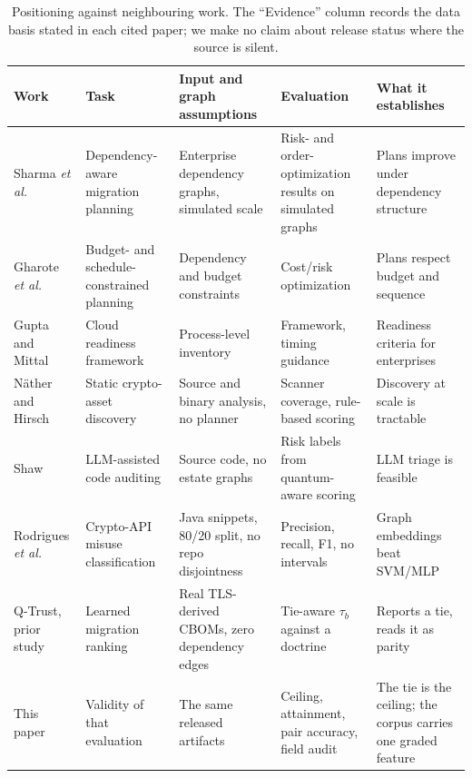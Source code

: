 \documentclass[journal,10pt]{IEEEtran}
\newcommand{\tb}{\tau_b}
\begin{document}
\begin{table}[t]
\centering
\caption{Positioning against neighbouring work. The ``Evidence'' column records the data basis
stated in each cited paper; we make no claim about release status where the source is silent.}
\label{tab:related}
\footnotesize
\begin{tabular}{@{}>{\raggedright\arraybackslash}p{2.5cm}>{\raggedright\arraybackslash}p{3.0cm}>{\raggedright\arraybackslash}p{3.5cm}>{\raggedright\arraybackslash}p{2.9cm}>{\raggedright\arraybackslash}p{3.1cm}@{}}
\toprule
Work & Task & Input and graph assumptions & Evaluation & What it establishes \\
\midrule
Sharma \emph{et al.}~\cite{sharma2026} & Dependency-aware migration planning & Enterprise dependency graphs, simulated scale & Risk- and order-optimization results on simulated graphs & Plans improve under dependency structure \\
Gharote \emph{et al.}~\cite{gharote2026} & Budget- and schedule-constrained planning & Dependency and budget constraints & Cost/risk optimization & Plans respect budget and sequence \\
Gupta and Mittal~\cite{gupta2026} & Cloud readiness framework & Process-level inventory & Framework, timing guidance & Readiness criteria for enterprises \\
N\"ather and Hirsch~\cite{nother2026} & Static crypto-asset discovery & Source and binary analysis, no planner & Scanner coverage, rule-based scoring & Discovery at scale is tractable \\
Shaw~\cite{shaw2026} & LLM-assisted code auditing & Source code, no estate graphs & Risk labels from quantum-aware scoring & LLM triage is feasible \\
Rodrigues \emph{et al.}~\cite{rodrigues2023} & Crypto-API misuse classification & Java snippets, 80/20 split, no repo disjointness & Precision, recall, F1, no intervals & Graph embeddings beat SVM/MLP \\
Q-Trust, prior study~\cite{qtrust_repo} & Learned migration ranking & Real TLS-derived CBOMs, zero dependency edges & Tie-aware $\tb$ against a doctrine & Reports a tie, reads it as parity \\
This paper & Validity of that evaluation & The same released artifacts & Ceiling, attainment, pair accuracy, field audit & The tie is the ceiling; the corpus carries one graded feature \\
\bottomrule
\end{tabular}
\end{table}
\end{document}
